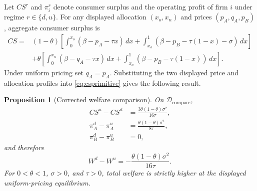 \documentclass[11pt]{article}
\newtheorem{proposition}{Proposition}
\begin{document}
Let $CS^r$ and $\pi_i^r$ denote consumer surplus and the operating profit of
firm $i$ under regime $r\in\{d,u\}$. For any displayed allocation
$(x_o,x_n)$ and prices $(p_A,q_A,p_B)$, aggregate consumer surplus is
\begin{align}
CS={}&(1-\theta)\left[
 \int_0^{x_o}(\beta-p_A-\tau x)\,dx
 +\int_{x_o}^1(\beta-p_B-\tau(1-x)-\sigma)\,dx
 \right] \\
&+\theta\left[
 \int_0^{x_n}(\beta-q_A-\tau x)\,dx
 +\int_{x_n}^1(\beta-p_B-\tau(1-x))\,dx
 \right].
\label{eq:csprimitive}
\end{align}
Under uniform pricing set $q_A=p_A$. Substituting the two displayed price and
allocation profiles into \eqref{eq:csprimitive} gives the following result.

\begin{proposition}[Corrected welfare comparison]
\label{prop:welfare}
On $\mathcal D_{\mathrm{compare}}$,
\begin{align}
 CS^u-CS^d
 &=\frac{3\theta(1-\theta)\sigma^2}{16\tau},\\
 \pi_A^d-\pi_A^u
 &=\frac{\theta(1-\theta)\sigma^2}{8\tau},\\
 \pi_B^d-\pi_B^u&=0,
\end{align}
and therefore
\begin{equation}
 W^d-W^u
 =-\frac{\theta(1-\theta)\sigma^2}{16\tau}.
\end{equation}
For $0<\theta<1$, $\sigma>0$, and $\tau>0$, total welfare is strictly higher
at the displayed uniform-pricing equilibrium.
\end{proposition}
\end{document}
